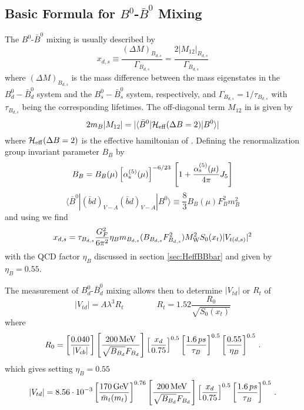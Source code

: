 \subsection{Basic Formula for $B^0$-$\bar B^0$ Mixing}
            \label{subsec:BBformula}
The $B^0$-$\bar B^0$ mixing is usually described by
\begin{equation}
x_{d,s} \equiv \frac{(\Delta M)_{B_{d,s}}}{\Gamma_{B_{d,s}}} =
\frac{2 |M_{12}|_{B_{d,s}}}{\Gamma_{B_{d,s}}}
\label{eq:xdsdef}
\end{equation}
where $(\Delta M)_{B_{d,s}}$ is the mass difference between the mass
eigenstates in the $B_d^0-\bar B_d^0$ system and the $B_s^0-\bar B_s^0$
system, respectively, and $\Gamma_{B_{d,s}} = 1/\tau_{B_{d,s}}$ with
$\tau_{B_{d,s}}$ being the corresponding lifetimes. The off-diagonal
term $M_{12}$ in  is given by
\begin{equation}
2 m_B |M_{12}| = |\langle \bar B^0| {\cal H}_{\rm eff}(\Delta B=2) |B^0\rangle|
\label{eq:M12Bdef}
\end{equation}
where ${\cal H}_{\rm eff}(\Delta B=2)$ is the effective hamiltonian of
. Defining the renormalization group invariant parameter $B_B$ by
\begin{equation}
B_B = B_B(\mu) \left[ \alpha_{\rm s}^{(5)}(\mu) \right]^{-6/23} \,
\left[ 1 + \frac{\alpha_{\rm s}^{(5)}(\mu)}{4\pi} J_5 \right]
\label{eq:BBrenorm}
\end{equation}
\begin{equation}
\langle \bar B^0| (\bar b d)_{V-A} (\bar b d)_{V-A} |B^0\rangle
\equiv \frac{8}{3} B_B(\mu) F_B^2 m_B^2
\label{eq:BbarB}
\end{equation}
and using  we find
\begin{equation}
x_{d,s} = \tau_{B_{d,s}} \frac{G_F^2}{6 \pi^2} \eta_B m_{B_{d,s}} (
B_{B_{d,s}} F_{B_{d,s}}^2 ) M_{\rm W}^2 S_0(x_t) |V_{t(d,s)}|^2
\label{eq:xds}
\end{equation}
with the QCD factor $\eta_B$ discussed in section \ref{sec:HeffBBbar}
and given by $\eta_B=0.55$.

The measurement of $B_d^0$-$\bar B_d^0$ mixing allows then to determine
$|V_{td}|$ or $R_t$ of 
\begin{equation}
|V_{td}| = A \lambda^3 R_t
\qquad
\qquad
R_t = 1.52 \frac{R_0}{\sqrt{S_0(x_t)}}
\label{eq:VtdRt}
\end{equation}
where
\begin{equation}
R_0 = 
\left[ \frac{0.040}{|V_{cb}|} \right]
\left[ \frac{200\, {\rm MeV}}{ \sqrt{B_{B_d}} F_{B_d} } \right]
\left[ \frac{x_d}{0.75}       \right]^{0.5} 
\left[ \frac{1.6\,ps}{\tau_B} \right]^{0.5}
\left[ \frac{0.55}{\eta_B}    \right]^{0.5} \, .
\label{eq:R0}
\end{equation}
which gives setting $\eta_B = 0.55$
\begin{equation}
|V_{td}| = 8.56 \cdot 10^{-3}
\left[ \frac{170\, {\rm GeV}}{\bar m_t(m_t)} \right]^{0.76} 
\left[ \frac{200\, {\rm MeV}}{ \sqrt{B_{B_d}} F_{B_d} } \right]
\left[ \frac{x_d}{0.75}             \right]^{0.5} 
\left[ \frac{1.6\,ps}{\tau_B}       \right]^{0.5} \, .
\label{eq:Vtdnum}
\end{equation}

